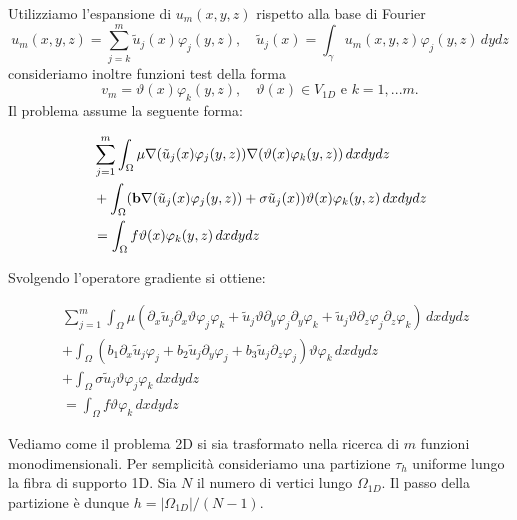 Utilizziamo l'espansione di $u_m(x,y,z)$ 
rispetto alla base di Fourier 
\begin{displaymath}
u_m(x,y,z)=\sum_{j=k}^m\tilde{u}_j(x)\varphi _j(y,z),\quad\tilde{u}_j(x)=\int_{\gamma}u_m(x,y,z) \varphi_j(y,z)\,dydz
\end{displaymath}
consideriamo inoltre funzioni test della forma 
$$v_m=\vartheta(x)\varphi _k(y,z),\quad \vartheta(x)\in V_{1D}\text{ e }
k=1,...m.$$ Il problema assume la seguente forma:

\begin{equation*}
\begin{split}
&\sum_{j=1}^m 
\int_\Omega\mu\nabla (\tilde{u}_j(x)\varphi _j(y,z))\nabla (\vartheta(x)\varphi _k(y,z))\,dxdydz\\
&+\int_\Omega(\mathbf{b}\nabla (\tilde{u}_j(x)\varphi _j(y,z))+\sigma\tilde{u}_j(x))\vartheta(x)\varphi _k(y,z)\,dxdydz\\
&=\int_\Omega f\vartheta(x)\varphi _k(y,z)\,dxdydz\\
\end{split}
\end{equation*}

Svolgendo l'operatore gradiente si ottiene:

\begin{equation*}
\begin{split}
&\sum_{j=1}^m
\int_\Omega\mu( \partial_x\tilde{u}_j \partial_x\vartheta\varphi _j\varphi _k + \tilde{u}_j \vartheta \partial_y\varphi _j\partial_y\varphi _k + \tilde{u}_j \vartheta \partial_z\varphi _j\partial_z\varphi _k)\,dxdydz \\
&+ \int_\Omega (b_1\partial_x\tilde{u}_j\varphi _j+b_2\tilde{u}_j\partial_y\varphi _j + b_3\tilde{u}_j\partial_z\varphi_j)\vartheta\varphi _k\,dxdydz\\ 
&+ \int_\Omega \sigma\tilde{u}_j\vartheta\varphi _j\varphi _k\,dxdydz \\
&=\int_\Omega f\vartheta\varphi _k\,dxdydz
\end{split}
\end{equation*}

Vediamo come il problema 2D si sia trasformato nella ricerca di $m$ funzioni monodimensionali.
Per semplicit\`a consideriamo una partizione $\tau_h$ uniforme lungo 
la fibra di supporto 1D.
Sia $N$ il numero di vertici lungo $\Omega_{1D}$.
Il passo della partizione \`e dunque $h=\vert \Omega_{1D}\vert / (N-1)$. 

